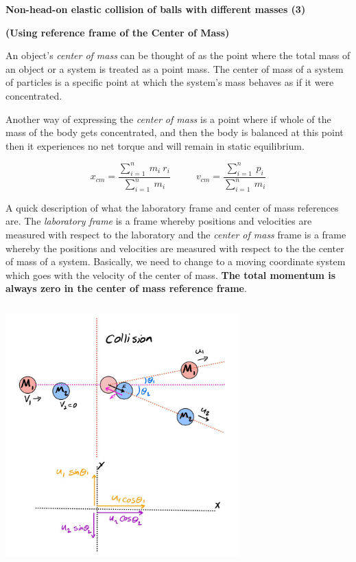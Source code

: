 \documentclass[fleqn]{article}
\begin{document}
\pagebreak

\textbf{Non-head-on elastic collision of balls with different masses (3)}

\textbf{(Using reference frame of the Center of Mass)}

\vspace{10px}

An object's \emph{center of mass} can be thought of as the point where the total mass of an object or a 
system is treated as a point mass. The center of mass of a system of particles is a specific point at 
which the system's mass behaves as if it were concentrated. 

Another way of expressing the \emph{center of mass} is a point where if whole of the mass of the body gets concentrated, 
and then the body is balanced at this point then it experiences no net torque and will remain in static equilibrium.

$$
  x_{cm}=\dfrac{
    \sum\limits_{i=1}^{n} ~ m_i ~ r_i
  }{
    \sum\limits_{i=1}^{n} ~ m_i
  } ~~~~~~~~~~~~
  v_{cm}=\dfrac{
    \sum\limits_{i=1}^{n} ~ p_i
  }{
    \sum\limits_{i=1}^{n} ~ m_i
  }
$$

A quick description of what the laboratory frame and center of mass references are. The \emph{laboratory frame} is a frame 
whereby positions and velocities are measured with respect to the laboratory and the \emph{center of mass} frame is a frame 
whereby the positions and velocities are measured with respect to the the center of mass of a system. Basically, we need 
to change to a moving coordinate system which goes with the velocity of the center of mass.\textbf{ The total momentum 
is always zero in the center of mass reference frame}.

\begin{center}
  \includegraphics[height=10cm, width=9cm]{3.JPG}
\end{center}
\end{document}
